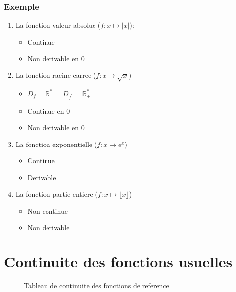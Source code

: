 \documentclass{article}
\begin{document}
\subsubsection*{Exemple}
\begin{enumerate}
	\item La fonction valeur absolue ($f:x \mapsto |x|$): 
		\begin{itemize}
			\item Continue
			\item Non derivable en 0
		\end{itemize}
	\item La fonction racine carree ($f:x \mapsto \sqrt{x}$)
		\begin{itemize}
			\item $D_f = \mathbb{R}^{*}$ \,\,\,\,\, $D_{f^{'}} = \mathbb{R}_{+}^{*}$
			\item Continue en 0
			\item Non derivable en 0
		\end{itemize}
	\item La fonction exponentielle ($f:x \mapsto e^x$)
		\begin{itemize}
			\item Continue
			\item Derivable
		\end{itemize}
	\item La fonction partie entiere ($f:x \mapsto \lfloor x \rfloor$)
		\begin{itemize}
			\item Non continue
			\item Non derivable
		\end{itemize}
\end{enumerate}
\section{Continuite des fonctions usuelles}
\begin{figure}[H]
	\centering
	\caption{Tableau de continuite des fonctions de reference}
\end{figure}	
\end{document}
